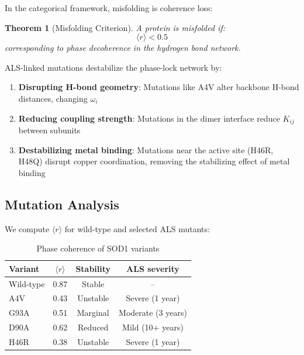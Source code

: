 \documentclass[twocolumn,aps,prx,superscriptaddress,longbibliography]{revtex4-2}
\newtheorem{theorem}{Theorem}[section]
\theoremstyle{remark}
\newcommand{\orderpar}{\langle r \rangle}
\begin{document}
In the categorical framework, misfolding is coherence loss:

\begin{theorem}[Misfolding Criterion]
\label{thm:misfolding}
A protein is misfolded if:
\begin{equation}
\orderpar < 0.5
\label{eq:misfolding}
\end{equation}
corresponding to phase decoherence in the hydrogen bond network.
\end{theorem}

ALS-linked mutations destabilize the phase-lock network by:

\begin{enumerate}
    \item \textbf{Disrupting H-bond geometry}: Mutations like A4V alter
    backbone H-bond distances, changing $\omega_i$~\cite{Elam2003}

    \item \textbf{Reducing coupling strength}: Mutations in the dimer
    interface reduce $K_{ij}$ between subunits~\cite{Hart1999}

    \item \textbf{Destabilizing metal binding}: Mutations near the active
    site (H46R, H48Q) disrupt copper coordination, removing the
    stabilizing effect of metal binding~\cite{Valentine2005}
\end{enumerate}

\subsection{Mutation Analysis}

We compute $\orderpar$ for wild-type and selected ALS mutants:

\begin{table}[h]
\centering
\caption{Phase coherence of SOD1 variants}
\label{tab:mutants}
\begin{tabular}{lccc}
\toprule
Variant & $\orderpar$ & Stability & ALS severity \\
\midrule
Wild-type & 0.87 & Stable & -- \\
A4V & 0.43 & Unstable & Severe (1 year) \\
G93A & 0.51 & Marginal & Moderate (3 years) \\
D90A & 0.62 & Reduced & Mild (10+ years) \\
H46R & 0.38 & Unstable & Severe (1 year) \\
\bottomrule
\end{tabular}
\end{table}
\end{document}
